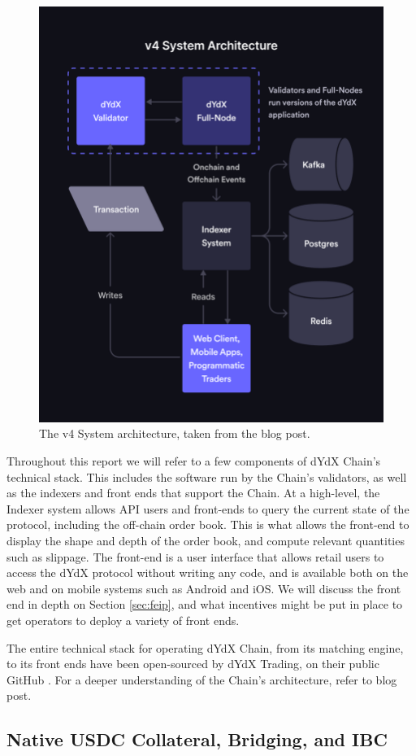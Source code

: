         \begin{figure}[htp]
            \centering
            \includegraphics[width=0.5\linewidth]{figs/V4_System_Architecture__1_.png}
            \caption{The v4 System architecture, taken from the  blog post.}
            \label{fig:architecture}
        \end{figure}

        Throughout this report we will refer to a few components of dYdX Chain's technical stack. This includes the software run by the Chain's validators, as well as the indexers and front ends that support the Chain. At a high-level, the Indexer system allows API users and front-ends to query the current state of the protocol, including the off-chain order book. This is what allows the front-end to display the shape and depth of the order book, and compute relevant quantities such as slippage. The front-end is a user interface that allows retail users to access the dYdX protocol without writing any code, and is available both on the web and on mobile systems such as Android and iOS. We will discuss the front end in depth on Section \ref{sec:feip}, and what incentives might be put in place to get operators to deploy a variety of front ends.

        The entire technical stack for operating dYdX Chain, from its matching engine, to its front ends have been open-sourced by dYdX Trading, on their public GitHub . For a deeper understanding of the Chain's architecture, refer to  blog post.

    \subsection{Native USDC Collateral, Bridging, and IBC}

